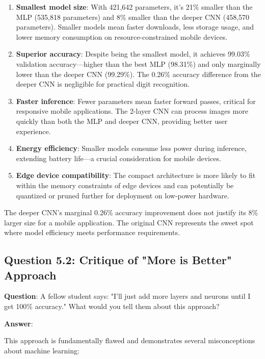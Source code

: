 \begin{enumerate}
    \item \textbf{Smallest model size}: With 421,642 parameters, it's 21\% smaller than the MLP (535,818 parameters) and 8\% smaller than the deeper CNN (458,570 parameters). Smaller models mean faster downloads, less storage usage, and lower memory consumption on resource-constrained mobile devices.
    
    \item \textbf{Superior accuracy}: Despite being the smallest model, it achieves 99.03\% validation accuracy---higher than the best MLP (98.31\%) and only marginally lower than the deeper CNN (99.29\%). The 0.26\% accuracy difference from the deeper CNN is negligible for practical digit recognition.
    
    \item \textbf{Faster inference}: Fewer parameters mean faster forward passes, critical for responsive mobile applications. The 2-layer CNN can process images more quickly than both the MLP and deeper CNN, providing better user experience.
    
    \item \textbf{Energy efficiency}: Smaller models consume less power during inference, extending battery life---a crucial consideration for mobile devices.
    
    \item \textbf{Edge device compatibility}: The compact architecture is more likely to fit within the memory constraints of edge devices and can potentially be quantized or pruned further for deployment on low-power hardware.
\end{enumerate}

The deeper CNN's marginal 0.26\% accuracy improvement does not justify its 8\% larger size for a mobile application. The original CNN represents the sweet spot where model efficiency meets performance requirements.

\subsection{Question 5.2: Critique of "More is Better" Approach}

\textbf{Question}: A fellow student says: "I'll just add more layers and neurons until I get 100\% accuracy." What would you tell them about this approach?

\textbf{Answer}:

This approach is fundamentally flawed and demonstrates several misconceptions about machine learning:

